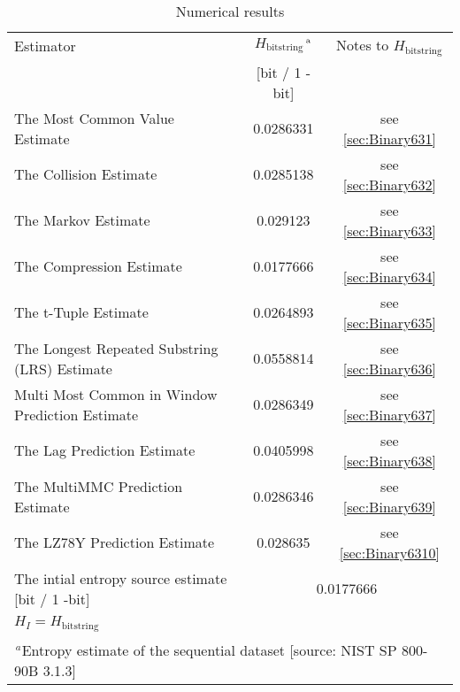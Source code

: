 \documentclass[a3paper,xelatex,english]{bxjsarticle}
\begin{document}
\begin{table}[h]
\caption{Numerical results}
\begin{center}
\begin{tabular}{|l|c|c|}
\hline 
\rowcolor{anotherlightblue} %
Estimator										& $H_{\textrm{bitstring}}$$^{\textrm{\,a}}$ & Notes to $H_{\textrm{bitstring}}$	\\ 
\cline{2-3}
\rowcolor{anotherlightblue} %
\,												& [bit / 1 - bit]		\\
\hline 
The Most Common Value Estimate					& 0.0286331& see \ref{sec:Binary631} \\
\hline 
The Collision Estimate							& 0.0285138& see \ref{sec:Binary632} \\
\hline 
The Markov Estimate								& 0.029123& see \ref{sec:Binary633} \\
\hline 
The Compression Estimate						& 0.0177666& see \ref{sec:Binary634} \\
\hline 
The t-Tuple Estimate							& 0.0264893& see \ref{sec:Binary635} \\
\hline 
The Longest Repeated Substring (LRS) Estimate	& 0.0558814& see \ref{sec:Binary636} \\
\hline 
Multi Most Common in Window Prediction Estimate	& 0.0286349& see \ref{sec:Binary637} \\
\hline 
The Lag Prediction Estimate						& 0.0405998& see \ref{sec:Binary638} \\
\hline 
The MultiMMC Prediction Estimate				& 0.0286346& see \ref{sec:Binary639} \\
\hline 
The LZ78Y Prediction Estimate					& 0.028635& see \ref{sec:Binary6310} \\
\hline \hline 
The intial entropy source estimate [bit / 1 -bit]	& \multicolumn{2}{|c|}{0.0177666}	\\
$H_{I} = H_{\textrm{bitstring}}$ & \multicolumn{2}{|c|}{ \, } 	\\
\hline \hline 
\multicolumn{3}{|l|}{$^{\,a}$\quad Entropy estimate of the sequential dataset [source: NIST SP 800-90B \cite{SP80090B} 3.1.3]} \\
\hline 
\end{tabular}
\end{center}
\end{table}
\end{document}
